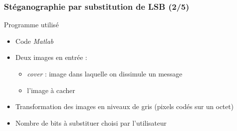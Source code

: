 \documentclass{beamer}
\begin{document}
	\begin{frame}
	\frametitle{Stéganographie par substitution de LSB (2/5)}
	\begin{alertblock}{Programme utilisé}
   	\rightskip=0pt\leftskip=0pt
	\begin{itemize}
	 	\item Code \textit{Matlab}
	 	\item Deux images en entrée :
	 		\begin{itemize}
	 		\item \textit{cover} : image dans laquelle on dissimule un message
	 		\item l'image à cacher
	 		\end{itemize}
	 	\item Transformation des images en niveaux de gris (pixels codés sur un octet)
	 	\item Nombre de bits à substituer choisi par l'utilisateur
	\end{itemize}
	\end{alertblock}
	\end{frame}
	
\end{document}
